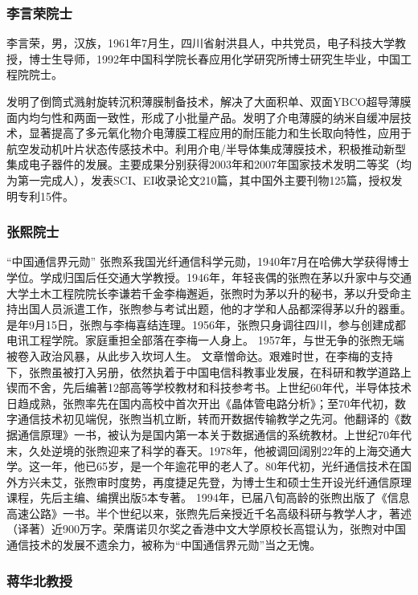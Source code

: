 \documentclass[UTF8]{ctexart}
\begin{document}
    \subsubsection{李言荣院士}
    李言荣，男，汉族，1961年7月生，四川省射洪县人，中共党员，电子科技大学教授，博士生导师，1992年中国科学院长春应用化学研究所博士研究生毕业，中国工程院院士。

    发明了倒筒式溅射旋转沉积薄膜制备技术，解决了大面积单、双面YBCO超导薄膜面内均匀性和两面一致性，形成了小批量产品。发明了介电薄膜的纳米自缓冲层技术，显著提高了多元氧化物介电薄膜工程应用的耐压能力和生长取向特性，应用于航空发动机叶片状态传感技术中。利用介电/半导体集成薄膜技术，积极推动新型集成电子器件的发展。主要成果分别获得2003年和2007年国家技术发明二等奖（均为第一完成人），发表SCI、EI收录论文210篇，其中国外主要刊物125篇，授权发明专利15件。

    \subsubsection{张熙院士}
    “中国通信界元勋”
    张煦系我国光纤通信科学元勋，1940年7月在哈佛大学获得博士学位。学成归国后任交通大学教授。1946年，年轻丧偶的张煦在茅以升家中与交通大学土木工程院院长李谦若千金李梅邂逅，张煦时为茅以升的秘书，茅以升受命主持出国人员派遣工作，张煦参与考试出题，他的才学和人品都深得茅以升的器重。是年9月15日，张煦与李梅喜结连理。1956年，张煦只身调往四川，参与创建成都电讯工程学院。家庭重担全部落在李梅一人身上。
    1957年，与世无争的张煦无端被卷入政治风暴，从此步入坎坷人生。
    文章憎命达。艰难时世，在李梅的支持下，张煦虽被打入另册，依然执着于中国电信科教事业发展，在科研和教学道路上锲而不舍，先后编著12部高等学校教材和科技参考书。上世纪60年代，半导体技术日趋成熟，张煦率先在国内高校中首次开出《晶体管电路分析》；至70年代初，数字通信技术初见端倪，张煦当机立断，转而开数据传输教学之先河。他翻译的《数据通信原理》一书，被认为是国内第一本关于数据通信的系统教材。上世纪70年代末，久处逆境的张煦迎来了科学的春天。1978年，他被调回阔别22年的上海交通大学。这一年，他已65岁，是一个年逾花甲的老人了。80年代初，光纤通信技术在国外方兴未艾，张煦审时度势，再度捷足先登，为博士生和硕士生开设光纤通信原理课程，先后主编、编撰出版5本专著。
    1994年，已届八旬高龄的张煦出版了《信息高速公路》一书。半个世纪以来，张煦先后亲授近千名高级科研与教学人才，著述（译著）近900万字。荣膺诺贝尔奖之香港中文大学原校长高锟认为，张煦对中国通信技术的发展不遗余力，被称为“中国通信界元勋”当之无愧。

    \subsubsection{蒋华北教授}
\end{document}
